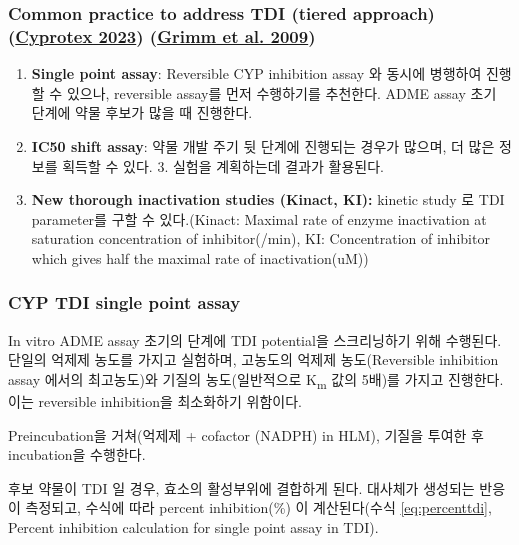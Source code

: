 \documentclass[
  11pt,
  krantz2, a4paper, twoside]{krantz}
\providecommand{\tightlist}{%
  \setlength{\itemsep}{0pt}\setlength{\parskip}{0pt}}
\begin{document}
\hypertarget{common-practice-to-address-tdi-tiered-approach-invitroadme-grimm2009conduct}{%
\subsubsection{\texorpdfstring{Common practice to address TDI (tiered approach) (\protect\hyperlink{ref-invitroadme}{Cyprotex 2023}) (\protect\hyperlink{ref-grimm2009conduct}{Grimm et al. 2009})}{Common practice to address TDI (tiered approach) (Cyprotex 2023) (Grimm et al. 2009)}}\label{common-practice-to-address-tdi-tiered-approach-invitroadme-grimm2009conduct}}

\begin{enumerate}
\def\labelenumi{\arabic{enumi}.}
\tightlist
\item
  \textbf{Single point assay}: Reversible CYP inhibition assay 와 동시에
  병행하여 진행할 수 있으나, reversible assay를 먼저 수행하기를
  추천한다. ADME assay 초기 단계에 약물 후보가 많을 때 진행한다.
\item
  \textbf{IC50 shift assay}: 약물 개발 주기 뒷 단계에 진행되는 경우가
  많으며, 더 많은 정보를 획득할 수 있다. 3. 실험을 계획하는데 결과가
  활용된다.
\item
  \textbf{New thorough inactivation studies (Kinact, KI):} kinetic study 로
  TDI parameter를 구할 수 있다.(Kinact: Maximal rate of enzyme
  inactivation at saturation concentration of inhibitor(/min), KI:
  Concentration of inhibitor which gives half the maximal rate of
  inactivation(uM))
\end{enumerate}

\hypertarget{cyp-tdi-single-point-assay}{%
\subsubsection{CYP TDI single point assay}\label{cyp-tdi-single-point-assay}}

In vitro ADME assay 초기의 단계에 TDI potential을 스크리닝하기 위해
수행된다. 단일의 억제제 농도를 가지고 실험하며, 고농도의 억제제
농도(Reversible inhibition assay 에서의 최고농도)와 기질의
농도(일반적으로 K\textsubscript{m} 값의 5배)를 가지고 진행한다. 이는 reversible
inhibition을 최소화하기 위함이다.

Preincubation을 거쳐(억제제 + cofactor (NADPH) in HLM), 기질을 투여한 후
incubation을 수행한다.

후보 약물이 TDI 일 경우, 효소의 활성부위에 결합하게 된다. 대사체가
생성되는 반응이 측정되고, 수식에 따라 percent inhibition(\%) 이
계산된다(수식 \eqref{eq:percenttdi}, Percent inhibition calculation for
single point assay in TDI).
\end{document}

